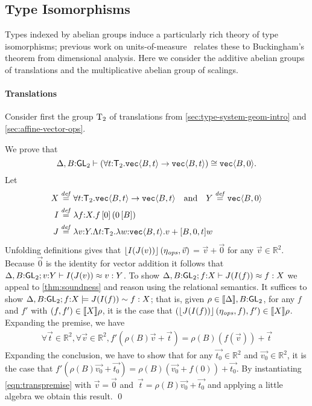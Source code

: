 \subsection{Type Isomorphisms}
\label{sec:types-indexed-abelian-groups}
Types indexed by abelian groups induce a particularly rich theory of
type isomorphisms; previous work on
units-of-measure~\cite{kennedy97relational} relates these to
Buckingham's theorem from dimensional analysis. Here we consider the
additive abelian groups of translations and the multiplicative abelian
group of scalings.

\paragraph{Translations} 
Consider first the group $\mathrm{T}_2$ of translations from
\autoref{sec:type-system-geom-intro} and 
\autoref{sec:affine-vector-ops}. 
\newcommand{\DeltaWithB}{\Delta,B\mathord:\SynGL{2}}

\begin{example}\label{ex:simpletrans}
We prove that
\[\DeltaWithB\vdash(\forall t\mathord:\SynTransl{2}.\tyPrim{vec}{B,t}\to\tyPrim{vec}{B,t}) \cong
\tyPrim{vec}{B,0}.
\]
Let 
\begin{align*}
X & \stackrel{\mathit{def}}=\forall t\mathord:\mathsf{T}_2.\textup{\texttt{vec}}\langle B,t \rangle\to\textup{\texttt{vec}}\langle B,t \rangle
\quad\text{and}\quad Y \stackrel{\mathit{def}}=\textup{\texttt{vec}}\langle B,0 \rangle\\
I & \stackrel{\mathit{def}}=\lambda f\mathord:X.f\,[0]\,(0\,[B])\\
J & \stackrel{\mathit{def}}=\lambda v\mathord:Y.\Lambda t\mathord:\mathsf{T}_2.\lambda w\mathord:\textup{\texttt{vec}}\langle B,t \rangle.v +[B,0,t] w
\end{align*}
Unfolding definitions gives that $\left\lfloor{I(J(v))}\right\rfloor(\eta_{\mathit{ops}},\vec{v})$ = $\vec{v}+\vec{0}$
for any $\vec{v}\in\mathbb R ^ 2$.  Because $\vec{0}$ is the identity for vector
addition it follows that $\ctxteq{\DeltaWithB}{v\mathord:Y}{I(J(v))}{v}Y$.
To show $\ctxteq{\DeltaWithB}{f\mathord:X}{J(I(f))}{f}{X}$ we appeal to
\autoref{thm:soundness} and reason using the relational semantics.  It
suffices to show $\semeq{\DeltaWithB}{f\mathord:X}{J(I(f))}{f}{X}$; that
is, given $\rho\in\semSort\DeltaWithB$, for any $f$ and $f'$ with
$(f,f')\in\llbracket X \rrbracket\rho$, it is the case that 
$(\left\lfloor{J(I(f))}\right\rfloor(\eta_{\mathit{ops}},f), f')\in\llbracket X \rrbracket\rho$.
Expanding the premise, we have
\begin{eqnarray}\label{eqn:transpremise}
\forall \vec{t}\in \mathbb R ^ 2,
\forall \vec{v}\in \mathbb R ^ 2,
f'(\rho(B)\vec{v} + \vec{t}) = \rho(B)(f(\vec{v})) + \vec{t}
\end{eqnarray}
Expanding the conclusion, we have to show that for any
$\vec{t_0}\in\mathbb R^2$ and $\vec{v_0}\in\mathbb R^2$, it is the case that
$f'(\rho(B)\vec{v_0} + \vec{t_0}) = \rho(B)(\vec{v_0} + f(0)) + \vec{t_0}$.
By instantiating \autoref{eqn:transpremise} with
$\vec{v}=\vec{0}$ and~$\vec{t}=\rho(B)\vec{v_0}+\vec{t_0}$ and applying a little algebra we obtain this result.
\qed
\end{example}

